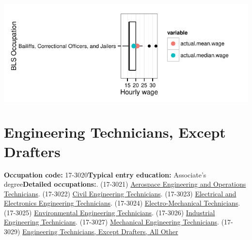 \documentclass[a4paper,10pt]{article}\usepackage[]{graphicx}\usepackage[]{color}
\makeatletter
\def\maxwidth{ %
  \ifdim\Gin@nat@width>\linewidth
    \linewidth
  \else
    \Gin@nat@width
  \fi
}
\makeatother
\begin{document}
{\centering \includegraphics[width=\maxwidth]{figure/unnamed-chunk-276} 

}


\newpage\section{Engineering Technicians, Except Drafters}\textbf{Occupation code:} 17-3020\newline\textbf{Typical entry education:} Associate's degree\newline\textbf{Detailed occupations:}. (17-3021)  \href{http://www.bls.gov/oes/current/oes173021.htm}{Aerospace Engineering and Operations Technicians}. (17-3022)  \href{http://www.bls.gov/oes/current/oes173022.htm}{Civil Engineering Technicians}. (17-3023)  \href{http://www.bls.gov/oes/current/oes173023.htm}{Electrical and Electronics Engineering Technicians}. (17-3024)  \href{http://www.bls.gov/oes/current/oes173024.htm}{Electro-Mechanical Technicians}. (17-3025)  \href{http://www.bls.gov/oes/current/oes173025.htm}{Environmental Engineering Technicians}. (17-3026)  \href{http://www.bls.gov/oes/current/oes173026.htm}{Industrial Engineering Technicians}. (17-3027)  \href{http://www.bls.gov/oes/current/oes173027.htm}{Mechanical Engineering Technicians}. (17-3029)  \href{http://www.bls.gov/oes/current/oes173029.htm}{Engineering Technicians, Except Drafters, All Other}\newline%
\end{document}
